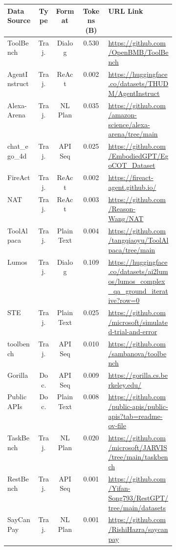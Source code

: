 \begin{table*}[ht]
\centering 
\renewcommand\arraystretch{0.98}
\fontsize{8}{10}\selectfont \setlength{\tabcolsep}{0.4em}
\begin{tabular}{@{}lcccp{0.4\linewidth}@{}}
\toprule
\textbf{Data Source} & \textbf{Type} & \textbf{Format} & \textbf{Tokens (B)} & \textbf{URL Link}\\\midrule 
ToolBench~\cite{qin2023toolllm} & Traj. & Dialog & 0.530 & \url{https://github.com/OpenBMB/ToolBench}\\
AgentInstruct~\cite{zeng2023agenttuning} & Traj. & ReAct & 0.002 & \url{https://huggingface.co/datasets/THUDM/AgentInstruct}\\
Alexa-Arena~\cite{gao2024alexa} & Traj. & NL Plan & 0.035 & \url{https://github.com/amazon-science/alexa-arena/tree/main} \\
chat\_ego\_4d~\cite{mu2024embodiedgpt} & Traj. & API Seq & 0.025 & \url{https://github.com/EmbodiedGPT/EgoCOT_Dataset}\\
FireAct~\cite{chen2023fireact} & Traj. & ReAct & 0.002 & \url{https://fireact-agent.github.io/}\\
NAT~\cite{wang2024learning} & Traj. & ReAct & 0.003 & \url{https://github.com/Reason-Wang/NAT}\\
ToolAlpaca~\cite{tang2023toolalpaca} & Traj. & Plain Text & 0.004 & \url{https://github.com/tangqiaoyu/ToolAlpaca/tree/main}\\
Lumos~\cite{yin2024agent} & Traj. & Dialog & 0.109 & \url{https://huggingface.co/datasets/ai2lumos/lumos_complex_qa_ground_iterative?row=0} \\
STE~\cite{wang2024llms} & Traj. & Plain Text & 0.025 & \url{https://github.com/microsoft/simulated-trial-and-error} \\
toolbench~\cite{xu2023on} & Traj. & API Seq & 0.010 & \url{https://github.com/sambanova/toolbench}\\
Gorilla~\cite{patil2023gorilla} & Doc. & API Seq & 0.009 & \url{https://gorilla.cs.berkeley.edu/}\\
PublicAPIs & Doc. & Plain Text & 0.008 & \url{https://github.com/public-apis/public-apis?tab=readme-ov-file} \\
TaskBench~\cite{shen2023taskbench} & Traj. & NL Plan & 0.020 & \url{https://github.com/microsoft/JARVIS/tree/main/taskbench} \\
RestBench~\cite{song2023restgpt} & Traj. & API Seq & 0.001 & \url{https://github.com/Yifan-Song793/RestGPT/tree/main/datasets} \\
SayCanPay~\cite{hazra2024saycanpay} & Traj. & NL Plan & 0.001 & \url{https://github.com/RishiHazra/saycanpay} \\

\end{tabular}
\end{table*}

